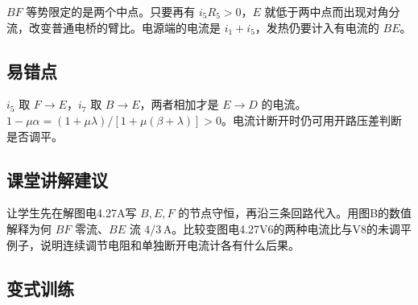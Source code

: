 \documentclass[UTF8,fontset=fandol,a4paper,11pt]{ctexart}
\begin{document}
$BF$ 等势限定的是两个中点。只要再有 $i_5R_5>0$，$E$ 就低于两中点而出现对角分流，改变普通电桥的臂比。电源端的电流是 $i_1+i_5$，发热仍要计入有电流的 $BE$。



\subsection*{易错点}

$i_5$ 取 $F\to E$，$i_7$ 取 $B\to E$，两者相加才是 $E\to D$ 的电流。$1-\mu\alpha=(1+\mu\lambda)/[1+\mu(\beta+\lambda)]>0$。电流计断开时仍可用开路压差判断是否调平。



\subsection*{课堂讲解建议}

让学生先在解图电4.27A写 $B,E,F$ 的节点守恒，再沿三条回路代入。用图B的数值解释为何 $BF$ 零流、$BE$ 流 $4/3\,\mathrm A$。比较变图电4.27V6的两种电流比与V8的未调平例子，说明连续调节电阻和单独断开电流计各有什么后果。


\subsection*{变式训练}
\end{document}
